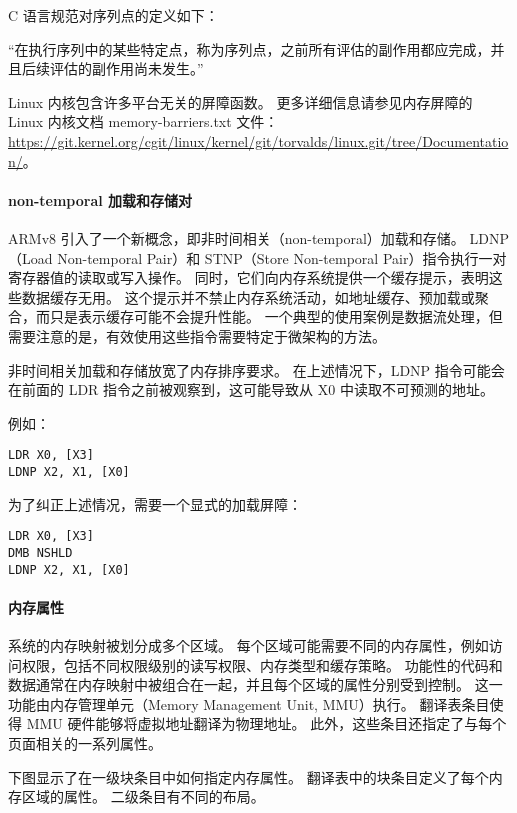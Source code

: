 C 语言规范对序列点的定义如下：

“在执行序列中的某些特定点，称为序列点，之前所有评估的副作用都应完成，并且后续评估的副作用尚未发生。”


Linux 内核包含许多平台无关的屏障函数。
更多详细信息请参见内存屏障的 Linux 内核文档 memory-barriers.txt 文件：
\url{https://git.kernel.org/cgit/linux/kernel/git/torvalds/linux.git/tree/Documentation/}。

\paragraph{non-temporal 加载和存储对}

ARMv8 引入了一个新概念，即非时间相关（non-temporal）加载和存储。
LDNP（Load Non-temporal Pair）和 STNP（Store Non-temporal Pair）指令执行一对寄存器值的读取或写入操作。
同时，它们向内存系统提供一个缓存提示，表明这些数据缓存无用。
这个提示并不禁止内存系统活动，如地址缓存、预加载或聚合，而只是表示缓存可能不会提升性能。
一个典型的使用案例是数据流处理，但需要注意的是，有效使用这些指令需要特定于微架构的方法。

非时间相关加载和存储放宽了内存排序要求。
在上述情况下，LDNP 指令可能会在前面的 LDR 指令之前被观察到，这可能导致从 X0 中读取不可预测的地址。

例如：

\begin{lstlisting}
LDR X0, [X3]
LDNP X2, X1, [X0]
\end{lstlisting}

为了纠正上述情况，需要一个显式的加载屏障：

\begin{lstlisting}
LDR X0, [X3]
DMB NSHLD
LDNP X2, X1, [X0]
\end{lstlisting}

\paragraph{内存属性}

系统的内存映射被划分成多个区域。
每个区域可能需要不同的内存属性，例如访问权限，包括不同权限级别的读写权限、内存类型和缓存策略。
功能性的代码和数据通常在内存映射中被组合在一起，并且每个区域的属性分别受到控制。
这一功能由内存管理单元（Memory Management Unit, MMU）执行。
翻译表条目使得 MMU 硬件能够将虚拟地址翻译为物理地址。
此外，这些条目还指定了与每个页面相关的一系列属性。

下图显示了在一级块条目中如何指定内存属性。
翻译表中的块条目定义了每个内存区域的属性。
二级条目有不同的布局。

